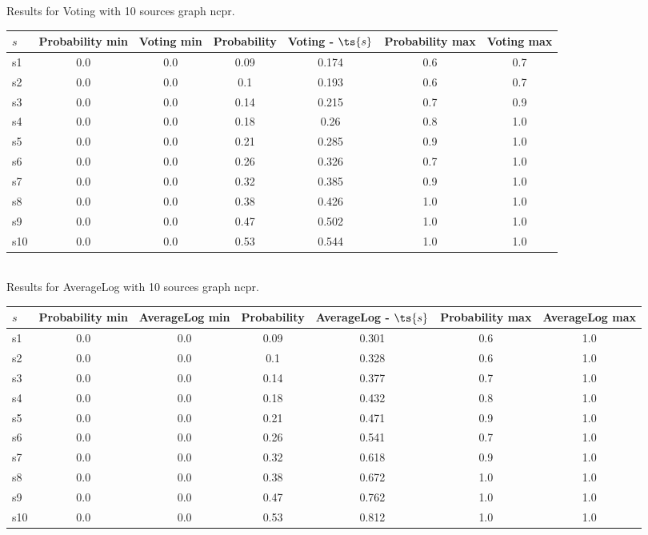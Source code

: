 \documentclass{article}
\begin{document}
\noindent Results for Voting with 10 sources graph ncpr.

\noindent\begin{tabular}{|l|c|c|c|c|c|c|}
\hline
$s$& Probability min & Voting min & Probability & Voting - $\ts{s}$ & Probability max & Voting max\\
\hline
s1 &0.0 & 0.0 & 0.09 & 0.174 & 0.6 & 0.7\\
\hline
s2 &0.0 & 0.0 & 0.1 & 0.193 & 0.6 & 0.7\\
\hline
s3 &0.0 & 0.0 & 0.14 & 0.215 & 0.7 & 0.9\\
\hline
s4 &0.0 & 0.0 & 0.18 & 0.26 & 0.8 & 1.0\\
\hline
s5 &0.0 & 0.0 & 0.21 & 0.285 & 0.9 & 1.0\\
\hline
s6 &0.0 & 0.0 & 0.26 & 0.326 & 0.7 & 1.0\\
\hline
s7 &0.0 & 0.0 & 0.32 & 0.385 & 0.9 & 1.0\\
\hline
s8 &0.0 & 0.0 & 0.38 & 0.426 & 1.0 & 1.0\\
\hline
s9 &0.0 & 0.0 & 0.47 & 0.502 & 1.0 & 1.0\\
\hline
s10 &0.0 & 0.0 & 0.53 & 0.544 & 1.0 & 1.0\\
\hline
\end{tabular}\\

\noindent Results for AverageLog with 10 sources graph ncpr.

\noindent\begin{tabular}{|l|c|c|c|c|c|c|}
\hline
$s$& Probability min & AverageLog min & Probability & AverageLog - $\ts{s}$ & Probability max & AverageLog max\\
\hline
s1 &0.0 & 0.0 & 0.09 & 0.301 & 0.6 & 1.0\\
\hline
s2 &0.0 & 0.0 & 0.1 & 0.328 & 0.6 & 1.0\\
\hline
s3 &0.0 & 0.0 & 0.14 & 0.377 & 0.7 & 1.0\\
\hline
s4 &0.0 & 0.0 & 0.18 & 0.432 & 0.8 & 1.0\\
\hline
s5 &0.0 & 0.0 & 0.21 & 0.471 & 0.9 & 1.0\\
\hline
s6 &0.0 & 0.0 & 0.26 & 0.541 & 0.7 & 1.0\\
\hline
s7 &0.0 & 0.0 & 0.32 & 0.618 & 0.9 & 1.0\\
\hline
s8 &0.0 & 0.0 & 0.38 & 0.672 & 1.0 & 1.0\\
\hline
s9 &0.0 & 0.0 & 0.47 & 0.762 & 1.0 & 1.0\\
\hline
s10 &0.0 & 0.0 & 0.53 & 0.812 & 1.0 & 1.0\\
\hline
\end{tabular}\\
\end{document}
